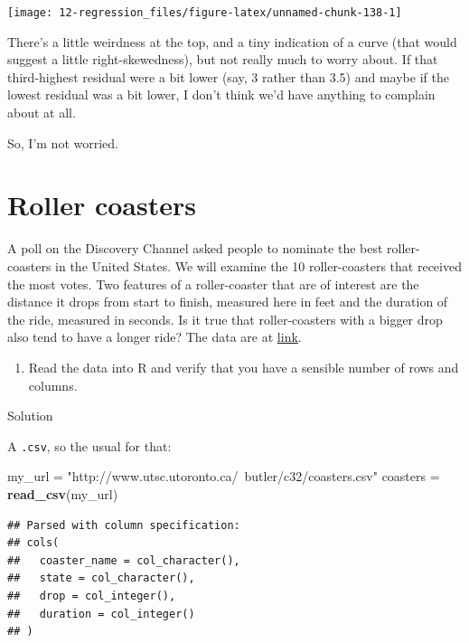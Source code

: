 \documentclass[]{tufte-book}
\newenvironment{Shaded}{}{}
\newcommand{\KeywordTok}[1]{\textcolor[rgb]{0.00,0.44,0.13}{\textbf{#1}}}
\newcommand{\NormalTok}[1]{#1}
\newcommand{\StringTok}[1]{\textcolor[rgb]{0.25,0.44,0.63}{#1}}
\providecommand{\tightlist}{%
  \setlength{\itemsep}{0pt}\setlength{\parskip}{0pt}}
\theoremstyle{definition}
\theoremstyle{definition}
\theoremstyle{definition}
\theoremstyle{remark}
\begin{document}
\texttt{[image: 12-regression\_files/figure-latex/unnamed-chunk-138-1]}

There's a little weirdness at the top, and a tiny indication of a curve
(that would suggest a little right-skewedness), but not really much to
worry about. If that third-highest residual were a bit lower (say, 3
rather than 3.5) and maybe if the lowest residual was a bit lower, I
don't think we'd have anything to complain about at all.

So, I'm not worried.

\hypertarget{roller-coasters}{%
\section{Roller coasters}\label{roller-coasters}}

A poll on the Discovery Channel asked people to nominate the best
roller-coasters in the United States. We will examine the 10
roller-coasters that received the most votes. Two features of a
roller-coaster that are of interest are the distance it drops from start
to finish, measured here in feet
and the duration of the ride, measured in seconds. Is it true that
roller-coasters with a bigger drop also tend to have a longer ride? The
data are at
\href{http://www.utsc.utoronto.ca/~butler/c32/coasters.csv}{link}.

\begin{enumerate}
\def\labelenumi{(\alph{enumi})}
\tightlist
\item
  Read the data into R and verify that you have a sensible number of
  rows and columns.
\end{enumerate}

Solution

A \texttt{.csv}, so the usual for that:

\begin{Shaded}
\begin{Highlighting}[]
\NormalTok{my_url =}\StringTok{ "http://www.utsc.utoronto.ca/~butler/c32/coasters.csv"}
\NormalTok{coasters =}\StringTok{ }\KeywordTok{read_csv}\NormalTok{(my_url)}
\end{Highlighting}
\end{Shaded}

\begin{verbatim}
## Parsed with column specification:
## cols(
##   coaster_name = col_character(),
##   state = col_character(),
##   drop = col_integer(),
##   duration = col_integer()
## )
\end{verbatim}
\end{document}
